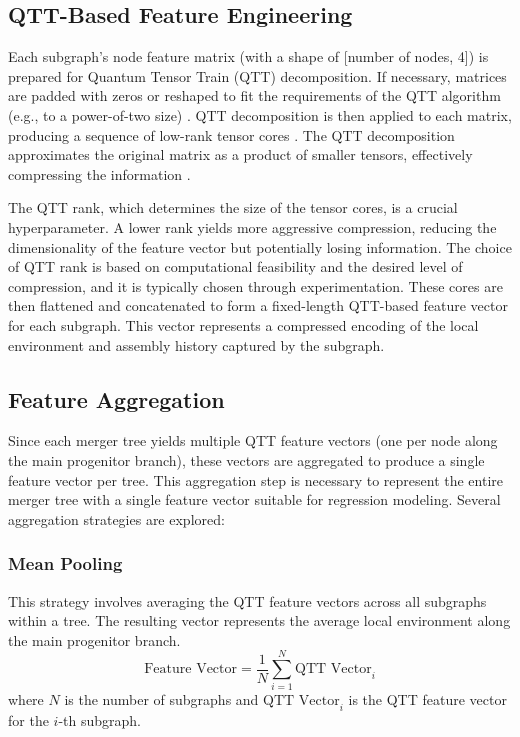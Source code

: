 \documentclass[twocolumn]{aastex631}
\begin{document}
\subsection{QTT-Based Feature Engineering}
Each subgraph's node feature matrix (with a shape of [number of nodes, 4]) is prepared for Quantum Tensor Train (QTT) decomposition. If necessary, matrices are padded with zeros or reshaped to fit the requirements of the QTT algorithm (e.g., to a power-of-two size) \citep{matveev2024estimatesquantizedtensortrain}. QTT decomposition is then applied to each matrix, producing a sequence of low-rank tensor cores \citep{bharadwaj2024efficientleveragescoresampling,matveev2024estimatesquantizedtensortrain}. The QTT decomposition approximates the original matrix as a product of smaller tensors, effectively compressing the information \citep{erpenbeck2023tensortraincontinuoustime,matveev2024estimatesquantizedtensortrain}.

The QTT rank, which determines the size of the tensor cores, is a crucial hyperparameter. A lower rank yields more aggressive compression, reducing the dimensionality of the feature vector but potentially losing information. The choice of QTT rank is based on computational feasibility and the desired level of compression, and it is typically chosen through experimentation. These cores are then flattened and concatenated to form a fixed-length QTT-based feature vector for each subgraph. This vector represents a compressed encoding of the local environment and assembly history captured by the subgraph.

\subsection{Feature Aggregation}
Since each merger tree yields multiple QTT feature vectors (one per node along the main progenitor branch), these vectors are aggregated to produce a single feature vector per tree. This aggregation step is necessary to represent the entire merger tree with a single feature vector suitable for regression modeling. Several aggregation strategies are explored:

\subsubsection{Mean Pooling}
This strategy involves averaging the QTT feature vectors across all subgraphs within a tree. The resulting vector represents the average local environment along the main progenitor branch.
\[
\text{Feature Vector} = \frac{1}{N} \sum_{i=1}^{N} \text{QTT Vector}_i
\]
where \(N\) is the number of subgraphs and \(\text{QTT Vector}_i\) is the QTT feature vector for the \(i\)-th subgraph.
\end{document}
